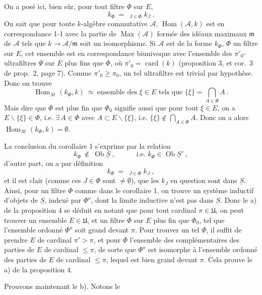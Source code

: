 \documentclass[11pt]{article}
\newcommand{\printedpage}[1]{\marginpar{\footnotesize p.~#1}}
\newcommand{\msp}[1]{\marginpar{\footnotesize [#1]}}
\newcommand{\limind}{\mathop{\underrightarrow{\mathrm{lim}}}}
\begin{document}
\msp{page 15}
On a posé ici, bien sûr, pour tout filtre $\Phi$ sur $E$,
\[
k_\Phi\ =\ \limind_{J\in\Phi}k_J\ .
\]
On sait que pour toute $k$-algèbre commutative $\mathcal{A}$, $\operatorname{Hom}(\mathcal{A},k)$ est en correspondance 1-1 avec la partie de $\operatorname{Max}(\mathcal{A})$ formée des idéaux maximaux $\mathfrak{m}$ de $\mathcal{A}$ tels que $k\longrightarrow\mathcal{A}/\mathfrak{m}$ soit un isomorphisme. Si $\mathcal{A}$ est de la forme $k_\Phi$, $\Phi$ un filtre sur $E$, cet ensemble est en correspondance biunivoque avec l'ensemble des $\pi'_0$-ultrafiltres $\Psi$ sur $E$ plus fins que $\Phi$, où $\pi'_0=\operatorname{card}(k)$ (proposition 3, et cor.~3 de prop.~2, page 7). Comme $\pi'_0\geqslant\pi_0$, un tel ultrafiltre est trivial par hypothèse. Donc on trouve
\[
\operatorname{Hom}_{\mathcal{M}}(k_\Phi,k)\ \simeq\ \text{ensemble des } \xi\in E \text{ tels que } \{\xi\}=\textstyle\bigcap_{A\in\Phi}A\ . \tag*{$(*)$}
\]
Mais dire que $\Phi$ est plus fin que $\Phi_0$ signifie aussi que pour tout $\xi\in E$, on a $E\backslash\{\xi\}\in\Phi$, i.e. $\exists\,A\in\Phi$ avec $A\subset E\backslash\{\xi\}$, i.e. $\{\xi\}\notin\bigcap_{A\in\Phi}A$. Donc on a alors $\operatorname{Hom}_{\mathcal{M}}(k_\Phi,k)=\emptyset$.

La conclusion du corollaire 1 s'exprime par la relation
\[
k_\Phi\ \notin\ \operatorname{Ob}\underline{S}\ ,\qquad\quad \text{i.e. } k_\Phi\in\operatorname{Ob}\underline{S}'\ ,
\]
d'autre part, on a par définition
\[
k_\Phi\ =\ \limind_{J\in\Phi}k_J\ ,
\]
\msp{page 16}
et il est clair (comme ces $J\in\Phi$ sont $\neq\emptyset$), que les $k_J$ en question sont dans $\underline{S}$. Ainsi, pour un filtre $\Phi$ comme dans le corollaire 1, on trouve un système inductif d'objets de $\underline{S}$, indexé par $\Phi^o$, dont la limite inductive n'est pas dans $\underline{S}$. Donc le a) de la proposition 4 se déduit en notant que pour tout cardinal $\pi\in\mathfrak{U}$, on peut trouver un ensemble $E\in\mathfrak{U}$, et un filtre $\Phi$ sur $E$ plus fin que $\Phi_0$, tel que l'ensemble ordonné $\Phi^o$ soit grand devant $\pi$. Pour trouver un tel $\Phi$, il suffit de prendre $E$ de cardinal $\pi'>\pi$, et pour $\Phi$ l'ensemble
\printedpage{198}
des complémentaires des parties de $E$ de cardinal $\leqslant\pi$, de sorte que $\Phi^o$ est isomorphe à l'ensemble ordonné des parties de $E$ de cardinal $\leqslant\pi$, lequel est bien grand devant $\pi$. Cela prouve le a) de la proposition 4.

Prouvons maintenant le b). Notons le
\end{document}
